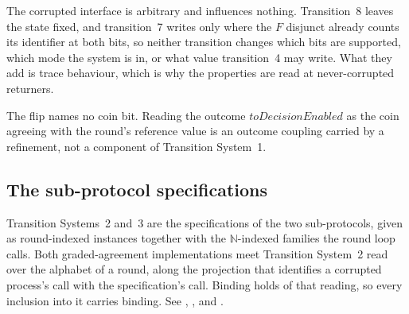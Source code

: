{The corrupted interface is arbitrary and influences nothing.
Transition~8 leaves the state fixed, and transition~7 writes only where the $F$ disjunct
already counts its identifier at both bits, so neither transition changes which bits
are supported, which mode the system is in, or what value transition~4 may write.
What they add is trace behaviour, which is why the properties are read at
never-corrupted returners.

The flip names no coin bit.
Reading the outcome $toDecisionEnabled$ as the coin agreeing with the round's reference value is an
outcome coupling carried by a refinement, not a component of Transition
System~1.
}



\subsection{The sub-protocol specifications}

Transition Systems~2 and~3 are the specifications of the two sub-protocols, given as round-indexed instances together with the $\mathbb{N}$-indexed families the round loop calls.
Both graded-agreement implementations meet Transition System~2 read over the alphabet of a round, along the projection that identifies a corrupted process's call with the specification's call.
Binding holds of that reading, so every inclusion into it carries binding.
See ,
,
 and
.



